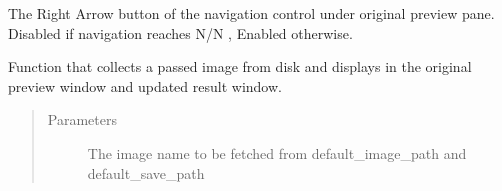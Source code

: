 \documentclass[letterpaper,10pt,english]{sphinxmanual}
\begin{document}
\begin{fulllineitems}
\begin{fulllineitems}
\label{\detokenize{pyleaf.leaf_area_calculator_gui:pyleaf.leaf_area_calculator_gui.LeafAreaCalculatorGUI.display_right}}
The Right Arrow button of the navigation control under original preview pane.
Disabled if navigation reaches N/N , Enabled otherwise.

\end{fulllineitems}


\begin{fulllineitems}
\label{\detokenize{pyleaf.leaf_area_calculator_gui:pyleaf.leaf_area_calculator_gui.LeafAreaCalculatorGUI.display_this_image}}
Function that collects a passed image from disk and displays in the original preview window and updated result window.
\begin{quote}\begin{description}
\item[{Parameters}] \leavevmode
{} \textendash{} The image name to be fetched from default\_image\_path and default\_save\_path

\end{description}\end{quote}

\end{fulllineitems}


\begin{fulllineitems}
\label{\detokenize{pyleaf.leaf_area_calculator_gui:pyleaf.leaf_area_calculator_gui.LeafAreaCalculatorGUI.documentation}}
\end{fulllineitems}



\end{fulllineitems}
\end{document}
